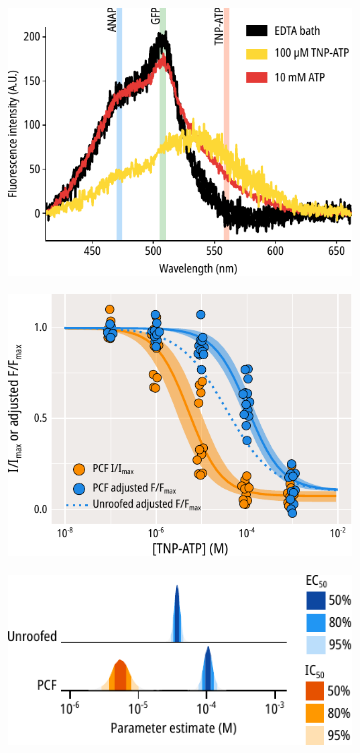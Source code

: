 \begin{figure}[hbtp]
\begin{subfigure}[t]{0.4\textwidth}
		\includegraphics[width=\textwidth]{atp_tnpatp_spectral_traces.pdf}
	\end{subfigure}
	\vfill
	\begin{subfigure}[t]{0.45\textwidth}
		\caption{}\label{ch3fig:pcf_1}
		\centering
		\includegraphics[width=\textwidth]{pcf_1.pdf}
	\end{subfigure}
	\hfill
	\begin{subfigure}[t]{0.45\textwidth}
		\caption{}\label{ch3fig:ec50_fits_4}
		\centering
		\includegraphics[width=\textwidth]{ec50_fits_4.pdf}

\end{subfigure}
\end{figure}
